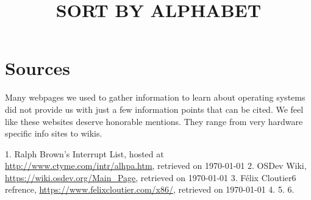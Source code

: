 \section{Sources}

Many webpages we used to gather information to learn about operating systems did not provide us with
just a few information points that can be cited. We feel like these websites deserve honorable
mentions. They range from very hardware specific info sites to wikis.

\title{SORT BY ALPHABET}

1. Ralph Brown's Interrupt List, hosted at \url{http://www.ctyme.com/intr/alhpa.htm}, retrieved on \today
2. OSDev Wiki, \url{https://wiki.osdev.org/Main_Page}, retrieved on \today
3. Félix Cloutier6 refrence, \url{https://www.felixcloutier.com/x86/}, retrieved on \today
4. 
5.
6.

